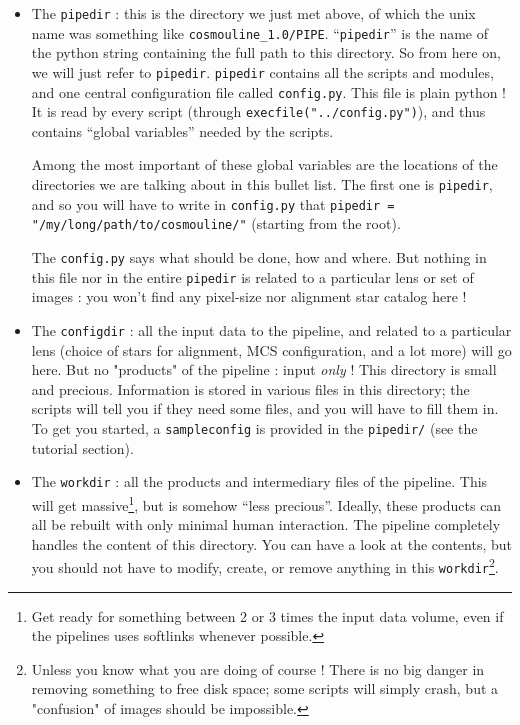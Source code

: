 \begin{itemize}

\item The \verb+pipedir+ : this is the directory we just met above, of which the unix name was something like \verb+cosmouline_1.0/PIPE+. ``\verb+pipedir+'' is the name of the python string containing the full path to this directory. So from here on, we will just refer to \verb+pipedir+.  \verb+pipedir+ contains all the scripts and modules, and one central configuration file called \verb+config.py+. This file is plain python ! It is read by every script (through \verb+execfile("../config.py")+), and thus contains ``global variables'' needed by the scripts.

Among the most important of these global variables are the locations of the directories we are talking about in this bullet list. The first one is \verb+pipedir+, and so you will have to write in \verb+config.py+ that \verb+pipedir = "/my/long/path/to/cosmouline/"+ (starting from the root).

The \verb+config.py+ says what should be done, how and where. But nothing in this file nor in the entire \verb+pipedir+ is related to a particular lens or set of images : you won't find any pixel-size nor alignment star catalog here !





\item The \verb+configdir+ : all the input data to the pipeline, and related to a particular lens (choice of stars for alignment, MCS configuration, and a lot more) will go here. But no "products" of the pipeline : input \emph{only} ! This directory is small and precious. Information is stored in various files in this directory; the scripts will tell you if they need some files, and you will have to fill them in.
To get you started, a \verb+sampleconfig+ is provided in the \verb+pipedir/+ (see the tutorial section).



\item The \verb+workdir+ : all the products and intermediary files of the pipeline. This will get massive\footnote{Get ready for something between 2 or 3 times the input data volume, even if the pipelines uses softlinks whenever possible.}, but is somehow ``less precious''. Ideally, these products can all be rebuilt with only minimal human interaction. The pipeline completely handles the content of this directory. You can have a look at the contents, but you should not have to modify, create, or remove anything in this  \verb+workdir+\footnote{Unless you know what you are doing of course ! There is no big danger in removing something to free disk space; some scripts will simply crash, but a "confusion" of images should be impossible.}.


\end{itemize}
